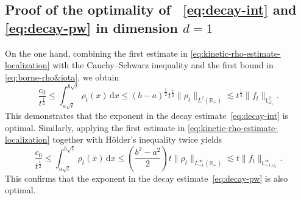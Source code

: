 \documentclass[11pt]{amsart}
\theoremstyle{definition}
\theoremstyle{remark}
\numberwithin{equation}{section}
\newcommand{\sfL}{\mathsf{L}}
\begin{document}
\subsection{Proof of the optimality of ~\eqref{eq:decay-int}  and \eqref{eq:decay-pw}  in dimension $d=1$}
\label{ss:ioptimality}

On the one hand, combining the first estimate in \eqref{eq:kinetic-rho-estimate-localization} with the Cauchy–Schwarz inequality and the first bound in \eqref{eq:borne-rho&iota}, we obtain
\begin{equation}
  \label{eq:kinetic-optimal1}
  \frac{c_0}{t^{\frac{1}{2}}} \leq \int_{a\sqrt{t}}^{b\sqrt{t}} \rho_t(x)\, \mathrm{d}x \leq (b-a)^{\frac{1}{2}} t^{\frac{1}{4}} \| \rho_t \|_{L^2(\mathbb{R}_+)} \lesssim t^{\frac{1}{4}} \| f_t \|_{\sfL^2_{\omega_1}}.
\end{equation}
This demonstrates that the exponent in the decay estimate~\eqref{eq:decay-int} is optimal. Similarly, applying the first estimate in \eqref{eq:kinetic-rho-estimate-localization} together with Hölder's inequality twice yields
\begin{equation}
  \label{eq:kinetic-optimal2}
  \frac{c_0}{t^{\frac{1}{2}}} \leq \int_{a\sqrt{t}}^{b\sqrt{t}} \rho_t(x)\, \mathrm{d}x \leq \left( \frac{b^2 - a^2}{2} \right) t \| \rho_t \|_{L^\infty_{-1}(\mathbb{R}_+)} \lesssim t \| f_t \|_{\sfL^\infty_{-1,\omega_1}}.
\end{equation}
This confirms that the exponent in the decay estimate~\eqref{eq:decay-pw} is also optimal.
 
\hspace{1cm}



\end{document}
